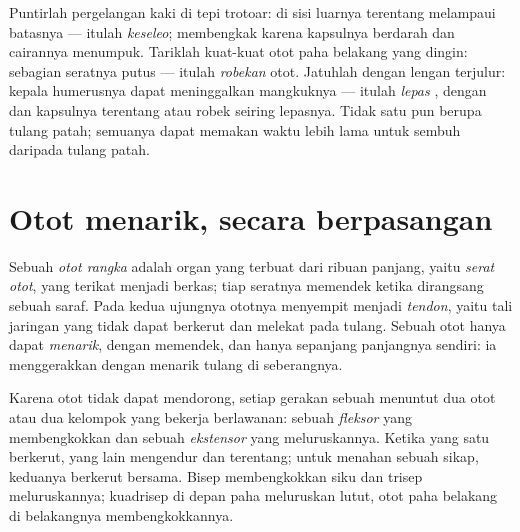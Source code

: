 \begin{example}\label{ex:g10:muscles-and-joints:injuries}
Puntirlah pergelangan kaki di tepi trotoar:  di sisi luarnya
terentang melampaui batasnya --- itulah \emph{keseleo}; 
membengkak karena kapsulnya berdarah dan cairannya menumpuk. Tariklah
kuat-kuat otot paha belakang yang dingin: sebagian seratnya putus ---
itulah \emph{robekan} otot. Jatuhlah dengan lengan terjulur: kepala
humerusnya dapat meninggalkan mangkuknya --- itulah \emph{lepas },
dengan  dan kapsulnya terentang atau robek seiring lepasnya.
Tidak satu pun berupa tulang patah; semuanya dapat memakan waktu lebih
lama untuk sembuh daripada tulang patah.
\end{example}

\section{Otot menarik, secara berpasangan}

\begin{definition}\label{def:g10:muscles-and-joints:muscle}
Sebuah \emph{otot rangka} adalah organ yang terbuat
dari ribuan  panjang, yaitu \emph{serat otot}, yang terikat menjadi
berkas; tiap seratnya memendek ketika dirangsang sebuah saraf. Pada
kedua ujungnya ototnya menyempit menjadi \emph{tendon},
yaitu tali jaringan yang tidak dapat berkerut dan melekat pada tulang.
Sebuah otot hanya dapat \emph{menarik}, dengan memendek, dan hanya
sepanjang panjangnya sendiri: ia menggerakkan  dengan menarik
tulang di seberangnya.
\end{definition}

\begin{proposition}\label{prop:g10:muscles-and-joints:antagonists}
Karena otot tidak dapat mendorong, setiap gerakan sebuah  menuntut
dua otot atau dua kelompok yang bekerja berlawanan: sebuah
\emph{fleksor} yang membengkokkan  dan sebuah \emph{ekstensor}
yang meluruskannya. Ketika yang satu berkerut, yang lain mengendur dan
terentang; untuk menahan sebuah sikap, keduanya berkerut bersama. Bisep
membengkokkan siku dan trisep meluruskannya; kuadrisep di depan paha
meluruskan lutut, otot paha belakang di belakangnya membengkokkannya.
\end{proposition}
\admitted


